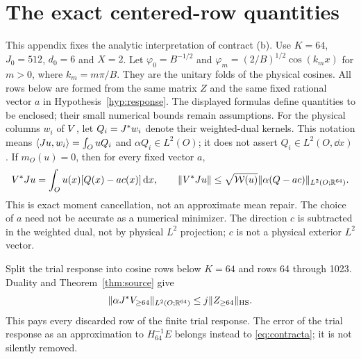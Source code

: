 \section{The exact centered-row quantities}\label{app:rows}
This appendix fixes the analytic interpretation of contract (b).
Use $K=64$, $J_0=512$, $d_0=6$ and $X=2$.
Let $\varphi_0=B^{-1/2}$ and
$\varphi_m=(2/B)^{1/2}\cos(k_mx)$ for $m>0$, where $k_m=m\pi/B$.
They are the unitary folds of the physical cosines.
All rows below are formed from the same matrix $Z$ and the same fixed rational vector $a$ in Hypothesis~\ref{hyp:response}.
The displayed formulas define quantities to be enclosed; their small numerical bounds remain assumptions.
For the physical columns $w_i$ of $V$, let $Q_i=J^*w_i$ denote
their weighted-dual kernels. This notation means
$\langle J u,w_i\rangle=\int_OuQ_i$ and
$\alpha Q_i\in L^2(O)$; it does not assert $Q_i\in L^2(O,\dd x)$.
If $m_O(u)=0$, then for every fixed vector $a$,
\begin{equation}\label{eq:centering}
 V^*J u=\int_Ou(x)[Q(x)-ac(x)]\mathop{}\!\mathrm d x,\qquad
 \lVert V^*J u\rVert\le\sqrt{\mathcal W(u)}\lVert\alpha(Q-ac)\rVert_{L^2(O;\mathbb R^{64})}.
\end{equation}
This is exact moment cancellation, not an approximate mean repair.
The choice of $a$ need not be accurate as a numerical minimizer.
The direction $c$ is subtracted in the weighted dual, not by physical
$L^2$ projection; $c$ is not a physical exterior $L^2$ vector.

Split the trial response into cosine rows below $K=64$ and rows
64 through 1023. Duality and Theorem~\ref{thm:source} give
\begin{equation}\label{eq:highrow}
 \lVert\alpha J^*V_{\ge64}\rVert_{L^2(O;\mathbb R^{64})}
 \le j\lVert Z_{\ge64}\rVert_{\rm HS}.
\end{equation}
This pays every discarded row of the finite trial response. The error
of the trial response as an approximation to $H_{64}^{-1}E$ belongs instead
to \eqref{eq:contracta}; it is not silently removed.

